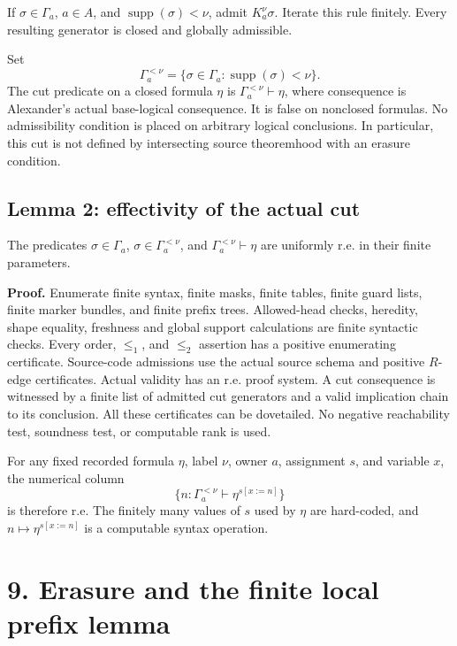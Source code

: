 \documentclass[
  11pt,
  letterpaper,
]{article}
\begin{document}
If \(\sigma\in\Gamma_a\), \(a\in A\), and
\(\operatorname{supp}(\sigma)<\nu\), admit \(K_a^\nu\sigma\). Iterate
this rule finitely. Every resulting generator is closed and globally
admissible.

Set \[
\Gamma_a^{<\nu}=
\{\sigma\in\Gamma_a:\operatorname{supp}(\sigma)<\nu\}.
\] The cut predicate on a closed formula \(\eta\) is
\(\Gamma_a^{<\nu}\vdash\eta\), where consequence is Alexander's actual
base-logical consequence. It is false on nonclosed formulas. No
admissibility condition is placed on arbitrary logical conclusions. In
particular, this cut is not defined by intersecting source theoremhood
with an erasure condition.

\subsection{Lemma 2: effectivity of the actual
cut}\label{lemma-2-effectivity-of-the-actual-cut}

The predicates \(\sigma\in\Gamma_a\), \(\sigma\in\Gamma_a^{<\nu}\), and
\(\Gamma_a^{<\nu}\vdash\eta\) are uniformly r.e. in their finite
parameters.

\textbf{Proof.} Enumerate finite syntax, finite masks, finite tables,
finite guard lists, finite marker bundles, and finite prefix trees.
Allowed-head checks, heredity, shape equality, freshness and global
support calculations are finite syntactic checks. Every order,
\(\leq_1\), and \(\leq_2\) assertion has a positive enumerating
certificate. Source-code admissions use the actual source schema and
positive \(R\)-edge certificates. Actual validity has an r.e. proof
system. A cut consequence is witnessed by a finite list of admitted cut
generators and a valid implication chain to its conclusion. All these
certificates can be dovetailed. No negative reachability test, soundness
test, or computable rank is used.

For any fixed recorded formula \(\eta\), label \(\nu\), owner \(a\),
assignment \(s\), and variable \(x\), the numerical column \[
\{n:\Gamma_a^{<\nu}\vdash\eta^{s[x:=n]}\}
\] is therefore r.e. The finitely many values of \(s\) used by \(\eta\)
are hard-coded, and \(n\mapsto\eta^{s[x:=n]}\) is a computable syntax
operation.

\section{9. Erasure and the finite local prefix
lemma}\label{erasure-and-the-finite-local-prefix-lemma}
\end{document}

